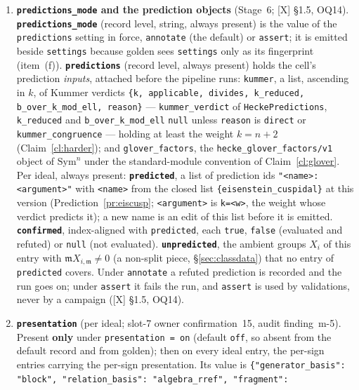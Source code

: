 \documentclass[11pt]{article}
\theoremstyle{remark}
\newcommand{\Sym}{\mathrm{Sym}}
\newcommand{\m}{\mathfrak{m}}
\begin{document}
\begin{enumerate}[label=(\alph*)]
  replaces both (\texttt{conway\_available} returns only with the Conway tables that
  Claim~\ref{cl:canon} permits the record to name).
\item \textbf{\texttt{predictions\_mode} and the prediction objects} (Stage~6; [X] \S1.5,
  OQ14). \textbf{\texttt{predictions\_mode}} (record level, string, always present) is the value
  of the \texttt{predictions} setting in force, \texttt{annotate} (the default) or
  \texttt{assert}; it is emitted beside \texttt{settings} because golden sees
  \texttt{settings} only as its fingerprint (item~(f)). \textbf{\texttt{predictions}} (record
  level, always present) holds the cell's prediction \emph{inputs}, attached before the
  pipeline runs: \texttt{kummer}, a list, ascending in $k$, of Kummer verdicts
  \texttt{\{k, applicable, divides, k\_reduced, b\_over\_k\_mod\_ell, reason\}} ---
  \texttt{kummer\_verdict} of \texttt{HeckePredictions}, \texttt{k\_reduced} and
  \texttt{b\_over\_k\_mod\_ell} \texttt{null} unless \texttt{reason} is \texttt{direct} or
  \texttt{kummer\_congruence} --- holding at least the weight $k=n+2$
  (Claim~\ref{cl:harder}); and \texttt{glover\_factors}, the
  \texttt{hecke\_glover\_factors/v1} object of $\Sym^n$ under the standard-module convention of
  Claim~\ref{cl:glover}. Per ideal, always present: \textbf{\texttt{predicted}}, a list of
  prediction ids \texttt{"<name>:<argument>"} with \texttt{<name>} from the closed list
  \texttt{\{eisenstein\_cuspidal\}} at this version (Prediction~\ref{pr:eiscusp};
  \texttt{<argument>} is \texttt{k=<w>}, the weight whose verdict predicts it); a new name is an
  edit of this list before it is emitted. \textbf{\texttt{confirmed}}, index-aligned with
  \texttt{predicted}, each \texttt{true}, \texttt{false} (evaluated and refuted) or
  \texttt{null} (not evaluated). \textbf{\texttt{unpredicted}}, the ambient groups $X_i$ of this
  entry with $\m X_{i,\m}\ne0$ (a non-split piece, \S\ref{sec:classdata}) that no entry of
  \texttt{predicted} covers. Under \texttt{annotate} a refuted prediction is recorded and the
  run goes on; under \texttt{assert} it fails the run, and \texttt{assert} is used by
  validations, never by a campaign ([X] \S1.5, OQ14).
\item \textbf{\texttt{presentation}} (per ideal; slot-7 owner confirmation~15, audit
  finding~m-5). Present \textbf{only} under \texttt{presentation = on} (default \texttt{off},
  so absent from the default record and from golden); then on every ideal entry, the per-sign
  entries carrying the per-sign presentation. Its value is
  \texttt{\{"generator\_basis": "block", "relation\_basis": "algebra\_rref", "fragment":
}
\end{enumerate}
\end{document}
